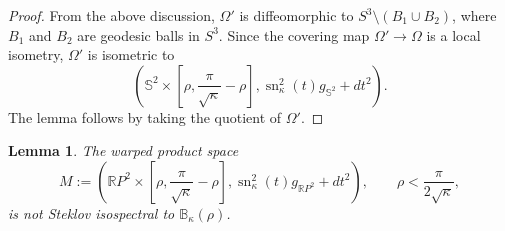 \documentclass[11pt]{amsart}
\newcommand{\sn}{\operatorname{sn}}
\newtheorem{lemma}[theorem]{Lemma}
\theoremstyle{definition}
\numberwithin{equation}{section}
\begin{document}
\begin{proof}
    From the above discussion, $\Omega'$ is diffeomorphic to $S^3\setminus (B_1\cup B_2)$, where $B_1$ and $B_2$ are geodesic balls in $S^3$. Since the covering map $\Omega'\to\Omega$ is a local isometry, $\Omega'$ is isometric to
    \[\left(\mathbb S^2\times \left[\rho,\frac{\pi}{\sqrt{\kappa}}-\rho\right], \sn_\kappa^2(t)g_{\mathbb S^{2}} + dt^2\right).\]
    The lemma follows by taking the quotient of $\Omega'$.
\end{proof}

\begin{lemma}
    \label{lem: nonisopectral}
    The warped product space
    \[M:=\left(\mathbb RP^2\times \left[\rho,\frac{\pi}{\sqrt{\kappa}}-\rho\right], \sn_\kappa^2(t)g_{\mathbb RP^2} + dt^2\right),\qquad \rho<\frac{\pi}{2\sqrt{\kappa}},\]
    is not Steklov isospectral to $\mathbb B_\kappa(\rho)$.
\end{lemma}
\end{document}
